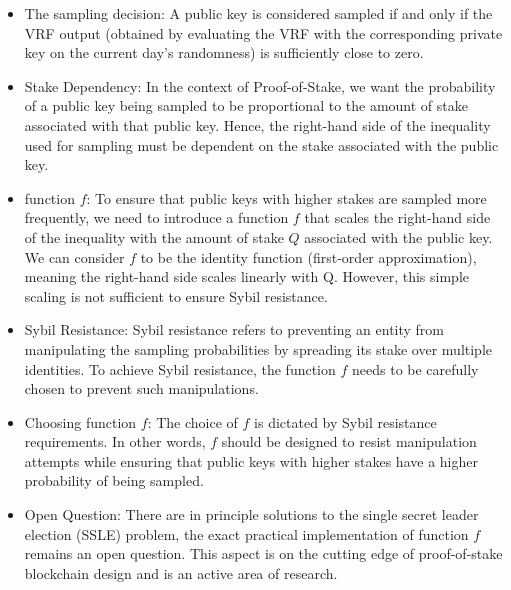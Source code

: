 \begin{itemize}
\item The sampling decision: A public key is considered sampled if and only if the VRF output (obtained by evaluating the VRF with the corresponding private key on the current day's randomness) is sufficiently close to zero.

\item Stake Dependency: In the context of Proof-of-Stake, we want the probability of a public key being sampled to be proportional to the amount of stake associated with that public key. Hence, the right-hand side of the inequality used for sampling must be dependent on the stake associated with the public key.

\item function $f$: To ensure that public keys with higher stakes are sampled more frequently, we need to introduce a function $f$ that scales the right-hand side of the inequality with the amount of stake $Q$ associated with the public key. We can consider $f$ to be the identity function (first-order approximation), meaning the right-hand side scales linearly with Q. However, this simple scaling is not sufficient to ensure Sybil resistance.

\item Sybil Resistance: Sybil resistance refers to preventing an entity from manipulating the sampling probabilities by spreading its stake over multiple identities. To achieve Sybil resistance, the function $f$ needs to be carefully chosen to prevent such manipulations.

\item Choosing function $f$: The choice of $f$ is dictated by Sybil resistance requirements. In other words, $f$ should be designed to resist manipulation attempts while ensuring that public keys with higher stakes have a higher probability of being sampled.

\item Open Question: There are in principle solutions to the single secret leader election (SSLE) problem, the exact practical implementation of function $f$ remains an open question. This aspect is on the cutting edge of proof-of-stake blockchain design and is an active area of research.
\end{itemize}

